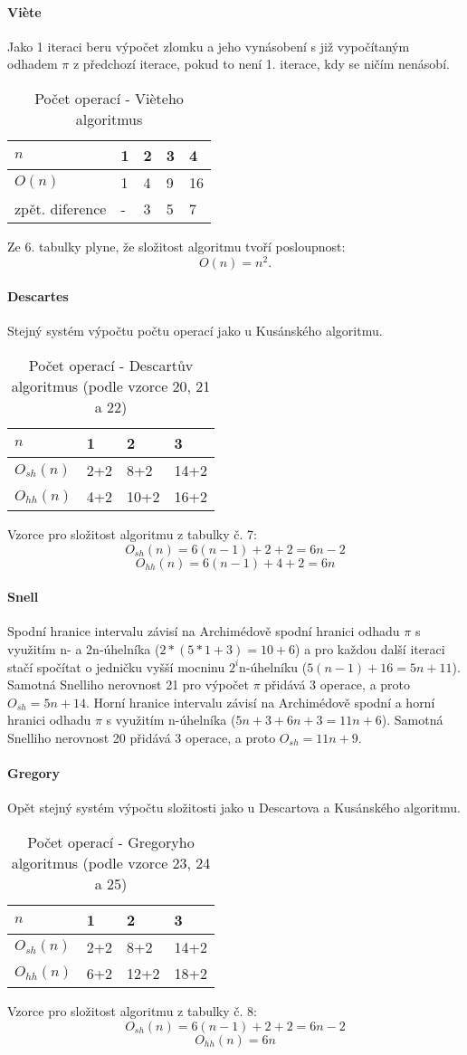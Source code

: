 \documentclass[soc]{gzwroc} %
\begin{document}
\paragraph{Viète}
Jako 1 iteraci beru výpočet zlomku a jeho vynásobení s již vypočítaným odhadem $\pi$ z předchozí iterace, pokud to není 1. iterace, kdy se ničím nenásobí.
\begin{table}[h!]
\caption{Počet operací - Vièteho algoritmus}
\begin{tabular}{|l||l|l|l|l|}
\hline
$n$ & 1&2&3&4 \\ \hline
$O(n)$&1&4&9&16 \\ \hline
zpět. diference&-&3&5&7 \\ \hline
\end{tabular}
\end{table}
Ze 6. tabulky plyne, že složitost algoritmu tvoří posloupnost:
$$
O(n)=n^2.
$$
\paragraph{Descartes}
Stejný systém výpočtu počtu operací jako u Kusánského algoritmu.
\begin{table}[h!]
\caption{Počet operací - Descartův algoritmus (podle vzorce 20, 21 a 22)}
\begin{tabular}{|l||l|l|l|}
\hline
$n$ & 1&2&3 \\ \hline
$O_{sh}(n)$&2+2&8+2&14+2 \\ \hline
$O_{hh}(n)$&4+2&10+2&16+2 \\ \hline
\end{tabular}
\end{table}
Vzorce pro složitost algoritmu z tabulky č. 7:
$$
O_{sh}(n)=6(n-1)+2+2=6n-2
$$
$$
O_{hh}(n)=6(n-1)+4+2=6n
$$
\paragraph{Snell}
Spodní hranice intervalu závisí na Archimédově spodní hranici odhadu $\pi$ s využitím n- a 
2n-úhelníka ($2*(5*1+3)=10+6$) a pro každou další iteraci stačí spočítat o jedničku vyšší mocninu $2^i$n-úhelníku ($5(n-1)+16=5n+11$). Samotná Snelliho nerovnost 21 pro výpočet $\pi$ přidává 3 operace, a proto $O_{sh}=5n+14$.
Horní hranice intervalu závisí na Archimédově spodní a horní hranici odhadu $\pi$ s využitím n-úhelníka ($5n+3+6n+3=11n+6$). Samotná Snelliho nerovnost 20 přidává 3 operace, a proto $O_{sh}=11n+9$.
\paragraph{Gregory}
Opět stejný systém výpočtu složitosti jako u Descartova a Kusánského algoritmu.
\begin{table}[h!]
\caption{Počet operací - Gregoryho algoritmus (podle vzorce 23, 24 a 25)}
\begin{tabular}{|l||l|l|l|}
\hline
$n$ & 1&2&3 \\ \hline
$O_{sh}(n)$&2+2&8+2&14+2 \\ \hline
$O_{hh}(n)$&6+2&12+2&18+2 \\ \hline
\end{tabular}
\end{table}
Vzorce pro složitost algoritmu z tabulky č. 8:
$$
O_{sh}(n)=6(n-1)+2+2=6n-2
$$
$$
O_{hh}(n)=6n
$$
\end{document}
